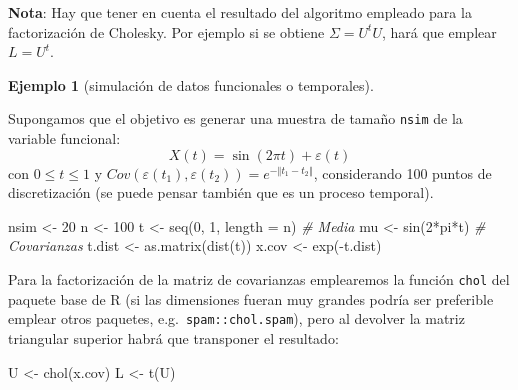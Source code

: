 \documentclass[
]{book}
\newenvironment{Shaded}{\begin{snugshade}}{\end{snugshade}}
\newcommand{\AttributeTok}[1]{\textcolor[rgb]{0.77,0.63,0.00}{#1}}
\newcommand{\CommentTok}[1]{\textcolor[rgb]{0.56,0.35,0.01}{\textit{#1}}}
\newcommand{\DecValTok}[1]{\textcolor[rgb]{0.00,0.00,0.81}{#1}}
\newcommand{\FunctionTok}[1]{\textcolor[rgb]{0.00,0.00,0.00}{#1}}
\newcommand{\NormalTok}[1]{#1}
\newcommand{\OtherTok}[1]{\textcolor[rgb]{0.56,0.35,0.01}{#1}}
\newcommand{\SpecialCharTok}[1]{\textcolor[rgb]{0.00,0.00,0.00}{#1}}
\theoremstyle{break}
\theoremstyle{definition}
\theoremstyle{definition}
\newtheorem{example}{Ejemplo}[chapter]
\theoremstyle{definition}
\theoremstyle{definition}
\theoremstyle{remark}
\begin{document}
\textbf{Nota}: Hay que tener en cuenta el resultado del algoritmo empleado
para la factorización de Cholesky. Por ejemplo si se obtiene \(\Sigma=U^tU\),
hará que emplear \(L=U^t.\)

\begin{example}[simulación de datos funcionales o temporales]
\protect\hypertarget{exm:funcional}{}{\label{exm:funcional} {} }
\end{example}

Supongamos que el objetivo es generar una muestra de tamaño \texttt{nsim} de la variable funcional:
\[X(t)=\sin\left(  2\pi t\right)  +\varepsilon\left(  t\right)\]
con \(0\leq t \leq1\) y \(Cov(\varepsilon\left( t_1 \right) , \varepsilon\left( t_2 \right) ) = e^{-\left\Vert t_1-t_2 \right\Vert }\),
considerando 100 puntos de discretización (se puede pensar también que es un proceso temporal).

\begin{Shaded}
\begin{Highlighting}[]
\NormalTok{nsim }\OtherTok{\textless{}{-}} \DecValTok{20}
\NormalTok{n }\OtherTok{\textless{}{-}} \DecValTok{100}
\NormalTok{t }\OtherTok{\textless{}{-}} \FunctionTok{seq}\NormalTok{(}\DecValTok{0}\NormalTok{, }\DecValTok{1}\NormalTok{, }\AttributeTok{length =}\NormalTok{ n)}
\CommentTok{\# Media}
\NormalTok{mu }\OtherTok{\textless{}{-}} \FunctionTok{sin}\NormalTok{(}\DecValTok{2}\SpecialCharTok{*}\NormalTok{pi}\SpecialCharTok{*}\NormalTok{t)}
\CommentTok{\# Covarianzas}
\NormalTok{t.dist }\OtherTok{\textless{}{-}} \FunctionTok{as.matrix}\NormalTok{(}\FunctionTok{dist}\NormalTok{(t))}
\NormalTok{x.cov }\OtherTok{\textless{}{-}} \FunctionTok{exp}\NormalTok{(}\SpecialCharTok{{-}}\NormalTok{t.dist)}
\end{Highlighting}
\end{Shaded}

Para la factorización de la matriz de covarianzas emplearemos la función \texttt{chol}
del paquete base de R (si las dimensiones fueran muy grandes podría ser preferible emplear
otros paquetes, e.g.~\texttt{spam::chol.spam}), pero al devolver la matriz triangular superior
habrá que transponer el resultado:

\begin{Shaded}
\begin{Highlighting}[]
\NormalTok{U }\OtherTok{\textless{}{-}} \FunctionTok{chol}\NormalTok{(x.cov)}
\NormalTok{L }\OtherTok{\textless{}{-}} \FunctionTok{t}\NormalTok{(U)}
\end{Highlighting}
\end{Shaded}
\end{document}
